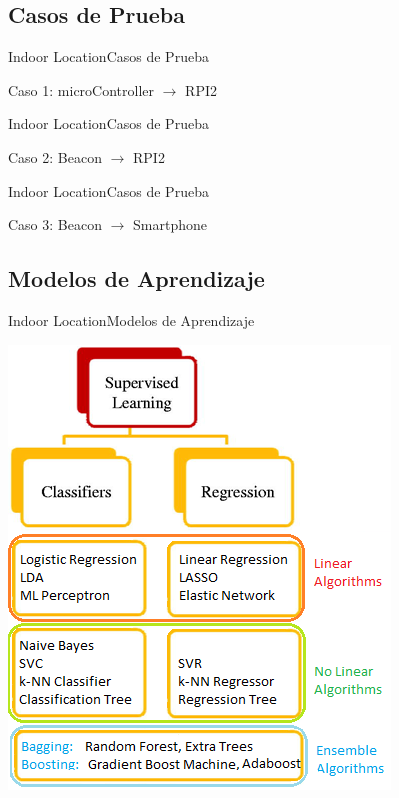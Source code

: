 \documentclass[10pt]{beamer}
\begin{document}
\subsection{Casos de Prueba}
\begin{frame}{Indoor Location}{Casos de Prueba}
\begin{block}{Caso 1: microController $\rightarrow$ RPI2}
\begin{multicols}{2}

\end{multicols}
\end{block}
\end{frame}

\begin{frame}{Indoor Location}{Casos de Prueba}
\begin{block}{Caso 2: Beacon $\rightarrow$ RPI2}
\begin{center}

\end{center}
\end{block}
\end{frame}

\begin{frame}{Indoor Location}{Casos de Prueba}
\begin{block}{Caso 3: Beacon $\rightarrow$ Smartphone}
\begin{center}

\end{center}
\end{block}
\end{frame}
\subsection{Modelos de Aprendizaje}
\begin{frame}{Indoor Location}{Modelos de Aprendizaje}
\begin{center}
\includegraphics[scale=0.6]{AAUgraphics/map}
\end{center}
\end{frame}
\end{document}

